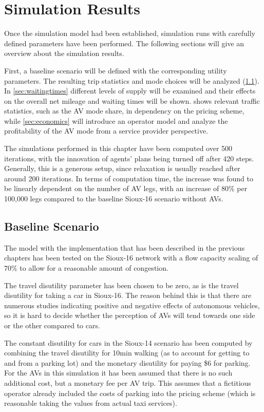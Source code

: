 \section{Simulation Results}
\label{sec:results}

Once the simulation model had been established, simulation runs with carefully
defined parameters have been performed. The following sections will give an
overview about the simulation results.

First, a baseline scenario will be defined with the corresponding utility parameters.
The resulting trip statistics and mode choices will be analyzed (\cref{sec:baselinesc}).
In \cref{sec:waitingtimes} different levels of supply will be examined and their
effects on the overall net mileage and waiting times will be shown. 
shows relevant traffic statistics, such as the AV mode share, in dependency on
the pricing scheme, while \cref{sec:economics} will introduce an operator model
and analyze the profitability of the AV mode from a service provider perspective.

The simulations performed in this chapter have been computed over 500 iterations,
with the innovation of agents' plans being turned off after 420 steps. Generally,
this is a generous setup, since relaxation is usually reached after around 200
iterations. In terms of computation time, the increase was found to be linearly
dependent on the number of AV legs, with an increase of $80\%$ per 100,000 legs
compared to the baseline Sioux-16 scenario without AVs.

\subsection{Baseline Scenario}
\label{sec:baselinesc}

The model with the implementation that has been described in the previous chapters
has been tested on the Sioux-16 network
with a flow capacity scaling of $70\%$ to allow for a reasonable amount of congestion.

The travel disutility parameter has been chosen to be zero, as is the travel
disutility for taking a car in Sioux-16. The reason behind this is that there are
numerous studies indicating positive and negative effects of autonomous vehicles, so
it is hard to decide whether the perception of AVs will tend towards one side or the
other compared to cars.

The constant disutility for cars in the Sioux-14 scenario
has been computed by combining the travel disutility for 10min walking (as to
account for getting to and from a parking lot) and the monetary disutility for
paying \$6 for parking. For the AVs in this simulation it has been assumed that
there is no such additional cost, but a monetary fee per AV trip. This
assumes that a fictitious operator already included the costs of parking into the
pricing scheme (which is reasonable taking the values from actual taxi services).

